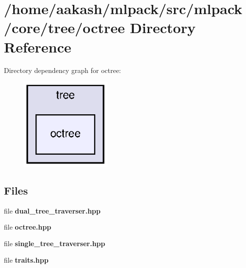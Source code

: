 \section{/home/aakash/mlpack/src/mlpack/core/tree/octree Directory Reference}
\label{dir_d6a1e83a35c0777ddb5f306ab15ead95}
Directory dependency graph for octree\+:
\nopagebreak
\begin{figure}[H]
\begin{center}
\leavevmode
\includegraphics[width=130pt]{dir_d6a1e83a35c0777ddb5f306ab15ead95_dep}
\end{center}
\end{figure}
\subsection*{Files}
\begin{DoxyCompactItemize}
\item 
file \textbf{ dual\+\_\+tree\+\_\+traverser.\+hpp}
\item 
file \textbf{ octree.\+hpp}
\item 
file \textbf{ single\+\_\+tree\+\_\+traverser.\+hpp}
\item 
file \textbf{ traits.\+hpp}
\end{DoxyCompactItemize}
